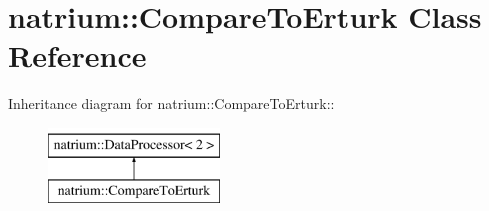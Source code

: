 \hypertarget{classnatrium_1_1CompareToErturk}{
\section{natrium::CompareToErturk Class Reference}
\label{classnatrium_1_1CompareToErturk}
}
Inheritance diagram for natrium::CompareToErturk::\begin{figure}[H]
\begin{center}
\leavevmode
\includegraphics[height=2cm]{classnatrium_1_1CompareToErturk}
\end{center}
\end{figure}

